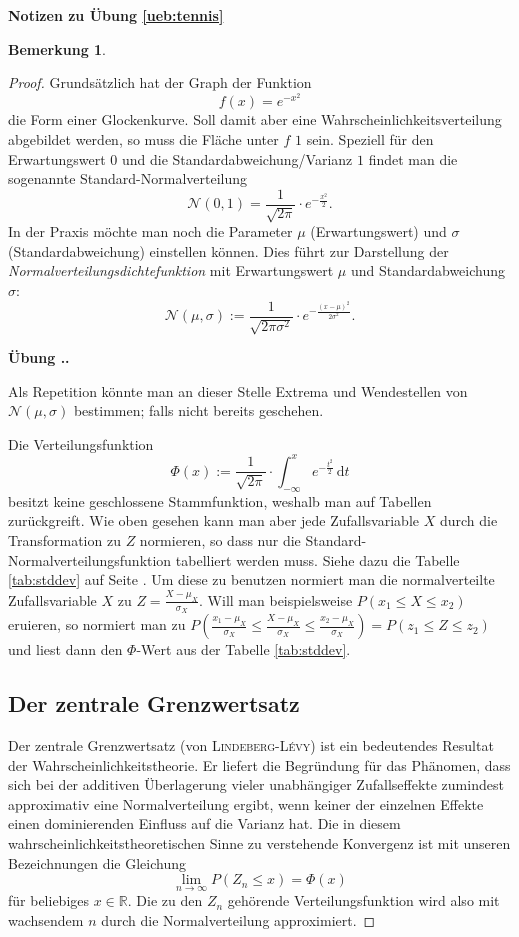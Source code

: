 \documentclass[%
<<<<<<< Updated upstream
11pt,%
twoside,%
titlepage,%
german,%
=======
11pt,%
twoside,%
titlepage,%
swissgerman,%
>>>>>>> Stashed changes
headsepline%
]{scrartcl}
\newcommand{\faEyeLightGray}{\textcolor{lightgray}{\faEye}} %
\newcommand{\faReturnGray}{\textcolor{gray}{\faMailReply}} %
\newcommand{\faEyeLightGray}{\textcolor{lightgray}{\faEye}} %
\newcommand{\definition}[1]{\colorbox{emerald}{#1}}
\theoremstyle{definition}
\newtheorem{bem}{Bemerkung}[subsection] %
\theoremstyle{plain}
\newcommand{\concatueb}[1]{ueb:#1}%
\newcommand{\concatlsg}[1]{lsg:#1}%
\newcounter{uebcounter}[section]
\renewcommand{\theuebcounter}{\thesection.\arabic{uebcounter}}  %
\newenvironment{lsg}[1]{%
    \par\noindent\textbf{Notizen zu Übung \ref{\concatueb{#1}}}\label{\concatlsg{#1}}
    \hfill\hyperref[\concatueb{#1}]{\faReturnGray}\par %
}{%
    \par%
}
\newenvironment{uebenv}[1]{%
    \refstepcounter{uebcounter}
    \par\noindent\textbf{Übung \theuebcounter.}%
    \label{\concatueb{#1}}\hfill\hyperref[\concatlsg{#1}]{\faEyeLightGray}\par
}{%
    \par
}
\newcounter{theo}[section]\setcounter{theo}{0}
\newcommand{\concatueb}[1]{ueb:#1}%
\newcommand{\concatlsg}[1]{lsg:#1}%
\newcounter{uebcounter}[section]
\renewcommand{\theuebcounter}{\thesection.\arabic{uebcounter}}  %
\newenvironment{lsg}[1]{%
    \par\noindent\textbf{Notizen zu Übung \ref{\concatueb{#1}}.}%
    \label{\concatlsg{#1}}
}{%
    \par%
}
\newenvironment{uebenv}[1]{%
    \refstepcounter{uebcounter}
    \par\noindent\textbf{Übung \theuebcounter.}%
    \label{\concatueb{#1}}\hfill\hyperref[\concatlsg{#1}]{\faEyeLightGray}\newline
}{%
    \par
}
\newcommand{\definition}[1]{\colorbox{emerald}{#1}}
\begin{document}
\begin{lsg}{tennis}
\begin{bem}
\begin{proof}
Grundsätzlich hat der Graph der Funktion
$$f(x)=e^{-x^2}$$
die Form einer Glockenkurve. Soll damit aber eine Wahrscheinlichkeitsverteilung abgebildet werden, so muss die Fläche unter $f$ $1$ sein. Speziell für den Erwartungswert $0$ und die Standardabweichung/Varianz $1$ findet man die sogenannte \definition{Standard-Normalverteilung}
$$\mathcal{N}(0,1)=\frac{1}{\sqrt{2\pi}}\cdot e^{-\frac{x^2}{2}}.$$
In der Praxis möchte man noch die Parameter $\mu$ (Erwartungswert) und $\sigma$ (Standardabweichung) einstellen können. Dies führt zur Darstellung der \emph{Normalverteilungsdichtefunktion} mit Erwartungswert $\mu$ und Standardabweichung $\sigma$:
$$\mathcal{N}(\mu,\sigma):=\frac{1}{\sqrt{2\pi\sigma^2}}\cdot e^{-\frac{(x-\mu)^2}{2\sigma^2}}.$$

\begin{uebenv}{}
Als Repetition könnte man an dieser Stelle Extrema und Wendestellen von $\mathcal{N}(\mu,\sigma)$ bestimmen; falls nicht bereits geschehen.
\end{uebenv}

Die Verteilungsfunktion
$$\Phi(x):=\frac{1}{\sqrt{2\pi}}\cdot\int_{-\infty}^{x} e^{-\frac{t^2}{2}}\,\mathrm{d}t$$
besitzt keine geschlossene Stammfunktion, weshalb man auf Tabellen zurückgreift. Wie oben gesehen kann man aber jede Zufallsvariable $X$ durch die Transformation zu $Z$ normieren, so dass nur die Standard-Normalverteilungsfunktion tabelliert werden muss. Siehe dazu die Tabelle \ref{tab:stddev} auf Seite \pageref{tab:stddev}. Um diese zu benutzen normiert man die normalverteilte Zufallsvariable $X$ zu $Z=\frac{X-\mu_{X}}{\sigma_{X}}$. Will man beispielsweise $P(x_{1}\leq X\leq x_{2})$ eruieren, so normiert man zu $P\left(\frac{x_{1}-\mu_{X}}{\sigma_{X}}\leq\frac{X-\mu_{X}}{\sigma_{X}}\leq \frac{x_{2}-\mu_{X}}{\sigma_{X}}\right)=P(z_{1}\leq Z\leq z_{2})$ und liest dann den $\Phi$-Wert aus der Tabelle \ref{tab:stddev}.

\subsection{Der zentrale Grenzwertsatz}

Der zentrale Grenzwertsatz (von \textsc{Lindeberg-Lévy}) ist ein bedeutendes Resultat der Wahrscheinlichkeitstheorie. Er liefert die Begründung für das Phänomen, dass sich bei der additiven Überlagerung vieler unabhängiger Zufallseffekte zumindest approximativ eine Normalverteilung ergibt, wenn keiner der einzelnen Effekte einen dominierenden Einfluss auf die Varianz hat. Die in diesem wahrscheinlichkeitstheoretischen Sinne zu verstehende Konvergenz ist mit unseren Bezeichnungen die Gleichung
$$\lim_{n\to\infty} P(Z_n\leq x)=\Phi(x)$$
für beliebiges $x\in\mathbb{R}$.
Die zu den $Z_n$ gehörende Verteilungsfunktion wird also mit wachsendem $n$ durch die Normalverteilung approximiert.


\end{proof}
\end{bem}
\end{lsg}
\end{document}
